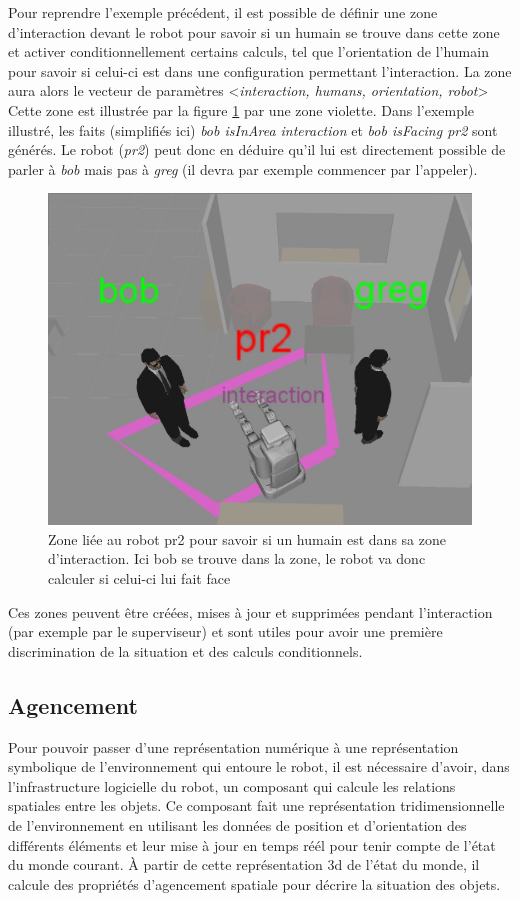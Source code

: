 \documentclass[a4paper,11pt,twoside]{StyleThese}
\begin{document}
Pour reprendre l'exemple précédent, il est possible de définir une zone d'interaction devant le robot pour savoir si un humain se trouve dans cette zone et activer conditionnellement certains calculs, tel que l'orientation de l'humain pour savoir si celui-ci est dans une configuration permettant l'interaction.
La zone aura alors le vecteur de paramètres <\textit{interaction, humans, orientation, robot}>
Cette zone est illustrée par la figure \ref{fig:interaction} par une zone violette.
Dans l'exemple illustré, les faits (simplifiés ici) \textit{bob isInArea interaction} et \textit{bob isFacing pr2} sont générés. Le robot (\textit{pr2}) peut donc en déduire qu'il lui est directement possible de parler à \textit{bob} mais pas à \textit{greg} (il devra par exemple commencer par l'appeler).


\begin{figure}[ht!]
 \centering
  \includegraphics[width=0.69\linewidth]{./img/interactionarea.jpg} 
  \caption {Zone liée au robot pr2 pour savoir si un humain est dans sa zone d'interaction. Ici bob se trouve dans la zone, le robot va donc calculer si celui-ci lui fait face}
  \label{fig:interaction}
\end{figure}

Ces zones peuvent être créées, mises à jour et supprimées pendant l'interaction (par exemple par le superviseur) et sont utiles pour avoir une première discrimination de la situation et des calculs conditionnels.


\subsection{Agencement}
\label{sec:agencement}
Pour pouvoir passer d'une représentation numérique à une représentation symbolique de l'environnement qui entoure le robot, il est nécessaire d'avoir, dans l'infrastructure logicielle du robot, un composant qui calcule les relations spatiales entre les objets. Ce composant fait une représentation tridimensionnelle de l'environnement en utilisant les données de position et d'orientation des différents éléments et leur mise à jour en temps réél pour tenir compte de l'état du monde courant. À partir de cette représentation 3d de l'état du monde, il calcule des propriétés d'agencement spatiale pour décrire la situation des objets.
\end{document}
